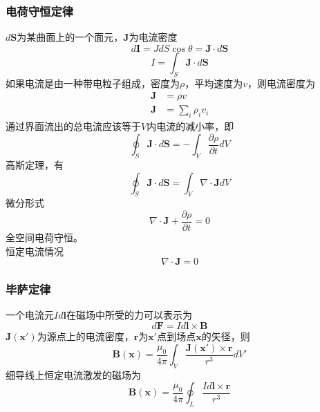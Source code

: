 \documentclass[12pt,a4paper]{ctexart}
\numberwithin{equation}{subsection}
\begin{document}
\subsubsection{电荷守恒定律}
$d\mathbf{S}$为某曲面上的一个面元，$\mathbf{J}$为电流密度
\begin{equation}
d\mathbf{I}=JdS\cos\theta=\mathbf{J}\cdot d\mathbf{S}
\end{equation}
\begin{equation}
I=\int_S\mathbf{J}\cdot d\mathbf{S}
\end{equation}
如果电流是由一种带电粒子组成，密度为$\rho$，平均速度为$v$，则电流密度为
\begin{equation}
\begin{aligned}
\mathbf{J}&=\rho v\\
\mathbf{J}&=\sum_i\rho_i v_i
\end{aligned}
\end{equation}
通过界面流出的总电流应该等于$V$内电流的减小率，即
\begin{equation}
\oint_S\mathbf{J}\cdot d\mathbf{S}=-\int_V\frac{\partial \rho}{\partial t}dV
\end{equation}
高斯定理，有
$$
\oint_S\mathbf{J}\cdot d\mathbf{S}=\int_V\nabla\cdot\mathbf{J}dV
$$
微分形式
\begin{equation}
\nabla\cdot\mathbf{J}+\frac{\partial \rho}{\partial t}=0
\end{equation}
全空间电荷守恒。\\
恒定电流情况
\begin{equation}
\nabla\cdot\mathbf{J}=0
\end{equation}

\subsubsection{毕萨定律}
一个电流元$Id\mathbf{l}$在磁场中所受的力可以表示为
\begin{equation}
d\mathbf{F}=Id\mathbf{l}\times\mathbf{B}
\end{equation}
$\mathbf{J}(\mathbf{x'})$为源点上的电流密度，$\mathbf{r}$为$\mathbf{x'}$点到场点$\mathbf{x}$的矢径，则
\begin{equation}
\mathbf{B}(\mathbf{x})=\frac{\mu_0}{4\pi}\int_V\frac{\mathbf{J}(\mathbf{x'})\times\mathbf{r}}{r^3}dV'
\end{equation}
细导线上恒定电流激发的磁场为
$$
\mathbf{B}(\mathbf{x})=\frac{\mu_0}{4\pi}\oint_L\frac{Id\mathbf{l}\times\mathbf{r}}{r^3}
$$
\end{document}
